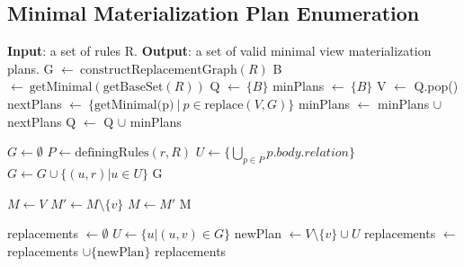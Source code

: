 \subsection{Minimal Materialization Plan Enumeration}
\label{ssec:enumeration}

\begin{algorithm}[t]
   \caption{Enumerate valid minimal materialization plans.} 
   \label{alg:enumerate}
   \footnotesize
   \begin{algorithmic}[1]
      \Statex \textbf{Input}: a set of rules R.
      \Statex \textbf{Output}: a set of valid minimal view materialization plans.
      \State G $\gets ~ \text{constructReplacementGraph}(R)$
      \State B $\gets ~ \text{getMinimal}(\text{getBaseSet}(R))$
      \State Q $\gets ~ \{ B \}$
      \State minPlans $\gets ~ \{ B \}$
        \State V $\gets$ Q.pop()
        \State nextPlans $\gets ~ \{ \text{getMinimal(p)} ~|~ p \in \text{replace}(V,G) \}$
        \State minPlans $\gets$ minPlans $\cup$ nextPlans
        \State Q $\gets$ Q $\cup$ 
      \EndWhile
      \State \Return minPlans

    \vspace{2mm}

            \State $G \gets \emptyset$
                \State $ P \gets \text{definingRules}(r,R) $
                    \State $U \gets \{ \bigcup_{p \in P} p.body.relation \}$
                        \State $G \gets G \cup \{(u, r) | u \in U \} $
                    \EndIf
                \EndIf
            \EndFor
            \State \Return G
    \EndFunction

    \vspace{2mm}


            \State $M \gets V$
                \State $M' \gets M \setminus \{ v \}$
                    \State $M \gets M'$
                \EndIf
            \EndFor
            \State \Return M
    \EndFunction

    \vspace{2mm}

            \State replacements $\gets \emptyset$
                \State $U \gets \{ u | (u,v) \in G \}$
                \State newPlan $\gets V \setminus \{ v \} \cup U$
                \State replacements $\gets $ replacements $\cup \{ \text{newPlan}\} $
            \EndFor
            \State \Return replacements
    \EndFunction
      
   \end{algorithmic}
\end{algorithm}


